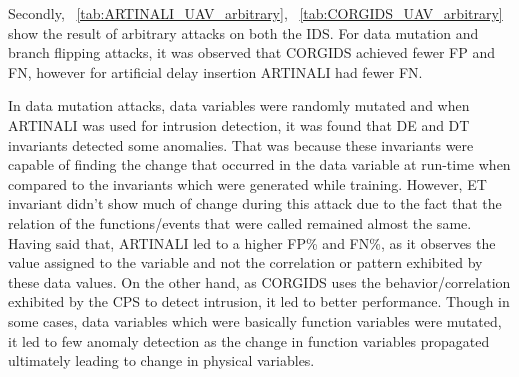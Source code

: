 Secondly, ~\autoref{tab:ARTINALI_UAV_arbitrary}, ~\autoref{tab:CORGIDS_UAV_arbitrary} show the result of arbitrary attacks on both the \ac{IDS}. For data mutation and branch flipping attacks, it was observed that \ac{CORGIDS} achieved fewer \ac{FP} and \ac{FN}, however for artificial delay insertion ARTINALI had fewer \ac{FN}.

\begin{table}
\centering
  \caption{Results of intrusion detection by ARTINALI for arbitrary attacks on \ac{UAV} platform}
  \label{tab:ARTINALI_UAV_arbitrary}
\end{table}

\begin{table}
\centering
  \caption{Results of intrusion detection by \ac{CORGIDS} for arbitrary attacks on \ac{UAV} platform}
  \label{tab:CORGIDS_UAV_arbitrary}
\end{table}


In data mutation attacks, data variables were randomly mutated and when ARTINALI was used for intrusion detection, it was found that D\textbar E and D\textbar T invariants detected some anomalies. That was because these invariants were capable of finding the change that occurred in the data variable at run-time when compared to the invariants which were generated while training. However, E\textbar T invariant didn't show much of change during this attack due to the fact that the relation of the functions/events that were called remained almost the same. Having said that, ARTINALI led to a higher \ac{FP}\% and \ac{FN}\%, as it observes the value assigned to the variable and not the correlation or pattern exhibited by these data values. On the other hand, as \ac{CORGIDS} uses the behavior/correlation exhibited by the \ac{CPS} to detect intrusion, it led to better performance. Though in some cases, data variables which were basically function variables were mutated, it led to few anomaly detection as the change in function variables propagated ultimately leading to change in physical variables.


